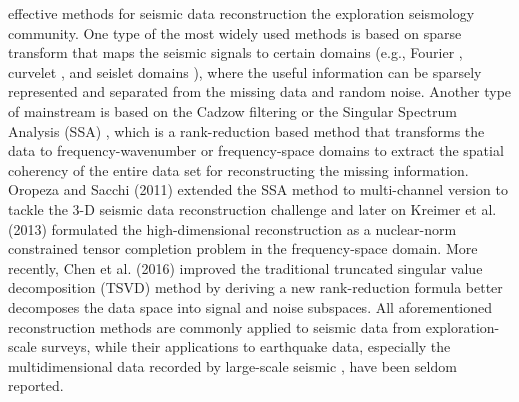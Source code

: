  effective methods for seismic data reconstruction  the exploration seismology community. One type of the most widely used methods is based on  sparse transform that maps the seismic signals to certain domains (e.g., Fourier \cite[]{abma2006}, curvelet \cite[]{yu2017mapping}, and seislet domains \cite[]{fomel2010seislet}), where the useful information can be sparsely represented and separated from the missing data and random noise. Another type of mainstream  is based on the Cadzow filtering or the Singular Spectrum Analysis (SSA) \cite[]{ssa}, which is a rank-reduction based method that transforms the data to frequency-wavenumber or frequency-space domains to extract the spatial coherency of the entire data set for reconstructing the missing information. Oropeza and Sacchi (2011) \cite[]{mssa} extended the SSA method to multi-channel version to tackle the 3-D seismic data reconstruction challenge and later on Kreimer et al. (2013) \cite[]{kreimer2013} formulated the high-dimensional reconstruction as a nuclear-norm constrained tensor completion problem in the frequency-space domain. More recently, Chen et al. (2016) \cite[]{yangkang2016irr5d} improved the traditional truncated singular value decomposition (TSVD) method by deriving a new rank-reduction formula better decomposes the data space into signal and noise subspaces. All aforementioned reconstruction methods are commonly applied to seismic data from exploration-scale surveys, while their applications to earthquake data, especially the multidimensional data recorded by large-scale seismic , have been seldom reported.


